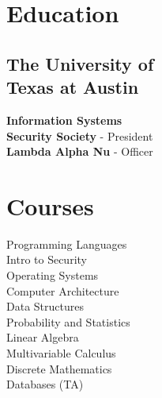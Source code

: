 \documentclass[]{houston-ethan-resume}
\begin{document}
%
%
\lastupdated

%
%

%
%

\begin{minipage}[t]{0.33\textwidth}


\section{Education}

    \subsection[]{The University of \\ Texas at Austin}
        \textbf{Information Systems \\ Security Society} - President \\
        \textbf{Lambda Alpha Nu} - Officer

%
%

\section{Courses}
Programming Languages \\
Intro to Security \\
Operating Systems \\
Computer Architecture \\
Data Structures \\
Probability and Statistics \\
Linear Algebra \\
Multivariable Calculus \\
Discrete Mathematics \\
Databases (TA)



\end{minipage}
\end{document}
